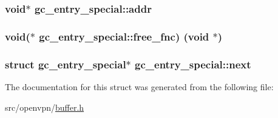 \subsubsection[{addr}]{\setlength{\rightskip}{0pt plus 5cm}void$\ast$ gc\+\_\+entry\+\_\+special\+::addr}\label{structgc__entry__special_a8572c27b2f891e2a44432687a7481599}
\hypertarget{structgc__entry__special_a6564f5d117211f869ba53423979c10bf}{}
\subsubsection[{free\+\_\+fnc}]{\setlength{\rightskip}{0pt plus 5cm}void($\ast$ gc\+\_\+entry\+\_\+special\+::free\+\_\+fnc) (void $\ast$)}\label{structgc__entry__special_a6564f5d117211f869ba53423979c10bf}
\hypertarget{structgc__entry__special_af951f02db6b8edbc95620f638bb7c8b6}{}
\subsubsection[{next}]{\setlength{\rightskip}{0pt plus 5cm}struct {\bf gc\+\_\+entry\+\_\+special}$\ast$ gc\+\_\+entry\+\_\+special\+::next}\label{structgc__entry__special_af951f02db6b8edbc95620f638bb7c8b6}


The documentation for this struct was generated from the following file\+:\begin{DoxyCompactItemize}
\item 
src/openvpn/\hyperlink{buffer_8h}{buffer.\+h}\end{DoxyCompactItemize}
